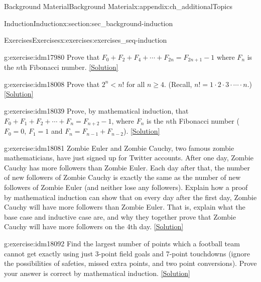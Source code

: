 \documentclass[oneside,10pt,]{book}
\numberwithin{equation}{chapter}
\newcommand{\lt}{<}
\begin{document}
\begin{appendixptx}{Background Material}{}{Background Material}{}{}{x:appendix:ch_additionalTopics}
\begin{sectionptx}{Induction}{}{Induction}{}{}{x:section:sec_background-induction}
\begin{exercises-subsection}{Exercises}{}{Exercises}{}{}{x:exercises:exercises_seq-induction}
\begin{divisionexercise}{4}{}{}{g:exercise:idm17980}%
Prove that \(F_0 + F_2 + F_4 + \cdots + F_{2n} = F_{2n+1} - 1\) where \(F_n\) is the \(n\)th Fibonacci number.%
\space\hspace*{0pt}\hfill{\tiny\hyperlink{g:solution:idm17986-main}{[Solution]}}\end{divisionexercise}%
\begin{divisionexercise}{5}{}{}{g:exercise:idm18008}%
Prove that \(2^n \lt  n!\) for all \(n \ge 4\). (Recall, \(n! = 1\cdot 2 \cdot 3 \cdot \cdots\cdot n\).)%
\space\hspace*{0pt}\hfill{\tiny\hyperlink{g:solution:idm18014-main}{[Solution]}}\end{divisionexercise}%
\begin{divisionexercise}{6}{}{}{g:exercise:idm18039}%
Prove, by mathematical induction, that \(F_0 + F_1 + F_2 + \cdots + F_{n} = F_{n+2} - 1\), where \(F_n\) is the \(n\)th Fibonacci number (\(F_0 = 0\), \(F_1 = 1\) and \(F_n = F_{n-1} + F_{n-2}\)).%
\space\hspace*{0pt}\hfill{\tiny\hyperlink{g:solution:idm18048-main}{[Solution]}}\end{divisionexercise}%
\begin{divisionexercise}{7}{}{}{g:exercise:idm18081}%
Zombie Euler and Zombie Cauchy, two famous zombie mathematicians, have just signed up for Twitter accounts. After one day, Zombie Cauchy has more followers than Zombie Euler. Each day after that, the number of new followers of Zombie Cauchy is exactly the same as the number of new followers of Zombie Euler (and neither lose any followers). Explain how a proof by mathematical induction can show that on every day after the first day, Zombie Cauchy will have more followers than Zombie Euler. That is, explain what the base case and inductive case are, and why they together prove that Zombie Cauchy will have more followers on the 4th day.%
\space\hspace*{0pt}\hfill{\tiny\hyperlink{g:solution:idm18084-main}{[Solution]}}\end{divisionexercise}%
\begin{divisionexercise}{8}{}{}{g:exercise:idm18092}%
Find the largest number of points which a football team cannot get exactly using just 3-point field goals and 7-point touchdowns (ignore the possibilities of safeties, missed extra points, and two point conversions). Prove your answer is correct by mathematical induction.%
\space\hspace*{0pt}\hfill{\tiny\hyperlink{g:solution:idm18095-main}{[Solution]}}\end{divisionexercise}%

\end{exercises-subsection}
\end{sectionptx}
\end{appendixptx}
\end{document}
